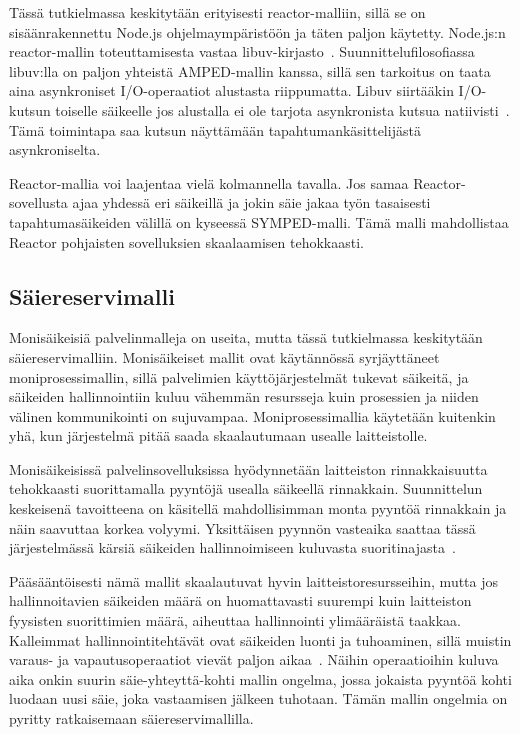\documentclass[12pt]{article}
\begin{document}
Tässä tutkielmassa keskitytään erityisesti
reactor-malliin, sillä se on sisäänrakennettu Node.js ohjelmaympäristöön ja
täten paljon käytetty. Node.js:n reactor-mallin toteuttamisesta vastaa
libuv-kirjasto~\cite{libuv_design_2019}. Suunnittelufilosofiassa
libuv:lla on paljon yhteistä AMPED-mallin kanssa, sillä
sen tarkoitus on taata aina asynkroniset I/O-operaatiot alustasta
riippumatta. Libuv siirtääkin I/O-kutsun toiselle säikeelle
jos alustalla ei ole tarjota asynkronista kutsua natiivisti~\cite{libuv_design_2019}.
Tämä toimintapa saa kutsun näyttämään tapahtumankäsittelijästä
asynkroniselta.

Reactor-mallia voi laajentaa vielä kolmannella tavalla.
Jos samaa Reactor-sovellusta ajaa yhdessä eri säikeillä
ja jokin säie jakaa työn tasaisesti tapahtumasäikeiden välillä
on kyseessä SYMPED-malli. Tämä malli mahdollistaa
Reactor pohjaisten sovelluksien skaalaamisen tehokkaasti.

\subsection{Säiereservimalli}
Monisäikeisiä palvelinmalleja on useita, mutta tässä tutkielmassa keskitytään säiereservimalliin.
Monisäikeiset mallit ovat käytännössä syrjäyttäneet moniprosessimallin,
sillä palvelimien käyttöjärjestelmät tukevat säikeitä, ja säikeiden hallinnointiin
kuluu vähemmän resursseja kuin prosessien ja niiden välinen kommunikointi on sujuvampaa.
Moniprosessimallia käytetään kuitenkin yhä, kun järjestelmä pitää
saada skaalautumaan usealle laitteistolle.

Monisäikeisissä palvelinsovelluksissa hyödynnetään laitteiston
rinnakkaisuutta tehokkaasti suorittamalla pyyntöjä usealla säikeellä rinnakkain.
Suunnittelun keskeisenä tavoitteena on käsitellä mahdollisimman monta pyyntöä rinnakkain ja 
näin saavuttaa korkea volyymi. Yksittäisen pyynnön
vasteaika saattaa tässä
järjestelmässä kärsiä säikeiden hallinnoimiseen kuluvasta suoritinajasta~\cite{easton_developing_2004}.

Pääsääntöisesti nämä mallit skaalautuvat hyvin laitteistoresursseihin,
mutta jos hallinnoitavien säikeiden määrä on huomattavasti suurempi kuin laitteiston
fyysisten suorittimien määrä, aiheuttaa hallinnointi ylimääräistä taakkaa.
Kalleimmat hallinnointitehtävät ovat säikeiden luonti ja tuhoaminen, sillä
muistin varaus- ja vapautusoperaatiot vievät paljon aikaa~\cite{ling_analysis_2000}.
Näihin operaatioihin kuluva aika onkin suurin säie-yhteyttä-kohti mallin
ongelma, jossa jokaista pyyntöä kohti
luodaan uusi säie, joka vastaamisen jälkeen tuhotaan.
Tämän mallin ongelmia on pyritty ratkaisemaan säiereservimallilla.
\end{document}
